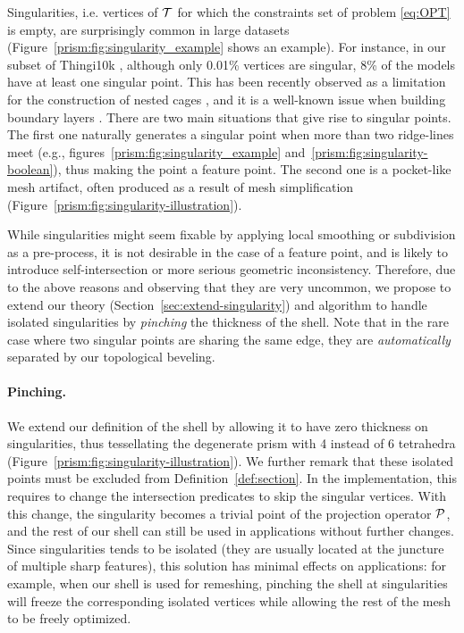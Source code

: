 Singularities, i.e. vertices of $\T$ for which the constraints set of problem \eqref{eq:OPT} is empty, are surprisingly common in large datasets (Figure~\ref{prism:fig:singularity_example} shows an example). For instance, in our subset of Thingi10k \cite{zhou2016thingi10k}, although only 0.01\% vertices are singular,  8\% of the models have at least one singular point. This has been recently observed as a limitation for the construction of nested cages \cite[Appendix A]{sacht2015nested}, and it is a well-known issue when building boundary layers \cite{aubry2015most,aubry2017boundary,garimella2000boundary}.
%
There are two main situations that give rise to singular points. 
The first one naturally generates a singular point when more than two ridge-lines meet (e.g., figures~\ref{prism:fig:singularity_example} and~\ref{prism:fig:singularity-boolean}), thus making the point a feature point. 
The second one is a pocket-like mesh artifact, often produced as a result of mesh simplification (Figure~\ref{prism:fig:singularity-illustration}).

While singularities might seem fixable by applying local smoothing or subdivision as a pre-process, it is not desirable in the case of a feature point, and is likely to introduce self-intersection or more serious geometric inconsistency.
Therefore, due to the above reasons and observing that they are very uncommon, we propose to extend our theory (Section~\ref{sec:extend-singularity}) and algorithm to handle isolated singularities  by \emph{pinching} the thickness of the shell. Note that in the rare case where two singular points are sharing the same edge, they are \emph{automatically} separated by our topological beveling.

\paragraph{Pinching.} 
We extend our definition of the shell by allowing it to have zero thickness on singularities, thus tessellating the degenerate prism with 4 instead of 6 tetrahedra (Figure~\ref{prism:fig:singularity-illustration}). We further remark that these isolated points must be excluded from Definition~\ref{def:section}. In the implementation, this requires to change the intersection predicates to skip the singular vertices.
With this change, the singularity becomes a trivial point of the projection operator $\P$,
and the rest of our shell can still be used in applications without further changes. Since singularities tends to be isolated (they are usually located at the juncture of multiple sharp features), this solution has minimal effects on applications: for example, when our shell is used for remeshing, pinching the shell at singularities will freeze the corresponding isolated vertices while allowing the rest of the mesh to be freely optimized.

